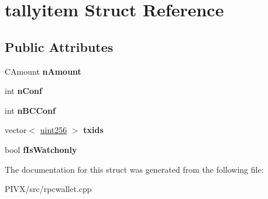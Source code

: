 \hypertarget{structtallyitem}{}\section{tallyitem Struct Reference}
\label{structtallyitem}
\subsection*{Public Attributes}
\begin{DoxyCompactItemize}
\item 
\mbox{\label{structtallyitem_acc553807f036face8ef10eac9f277d79}} 
C\+Amount {\bfseries n\+Amount}
\item 
\mbox{\label{structtallyitem_a3b2facf2b1290561c5eabb22bc26c22d}} 
int {\bfseries n\+Conf}
\item 
\mbox{\label{structtallyitem_a26a2ae690f2b19636b2d87992ae7e123}} 
int {\bfseries n\+B\+C\+Conf}
\item 
\mbox{\label{structtallyitem_aa98973cace2783207b4d8bca7cc45a51}} 
vector$<$ \mbox{\hyperlink{classuint256}{uint256}} $>$ {\bfseries txids}
\item 
\mbox{\label{structtallyitem_a9e7a70ef944206ebb0f3a394eba92673}} 
bool {\bfseries f\+Is\+Watchonly}
\end{DoxyCompactItemize}


The documentation for this struct was generated from the following file\+:\begin{DoxyCompactItemize}
\item 
P\+I\+V\+X/src/rpcwallet.\+cpp\end{DoxyCompactItemize}
